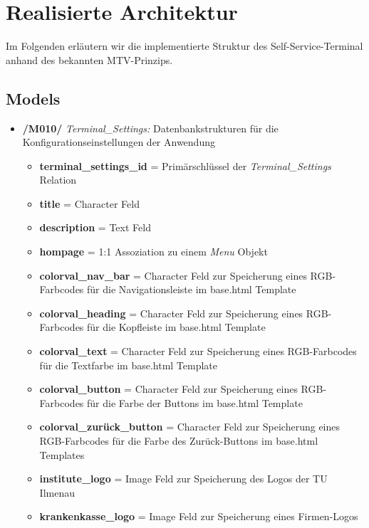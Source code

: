 \section{Realisierte Architektur}

Im Folgenden erläutern wir die implementierte Struktur des Self-Service-Terminal anhand des bekannten MTV-Prinzips.

\subsection{Models}
\begin{itemize}
    \item \textbf{/M010/} \textit{Terminal\_Settings:} Datenbankstrukturen für die Konfigurationseinstellungen der Anwendung
    \begin{itemize}
        \item \textbf{terminal\_settings\_id} = Primärschlüssel der \textit{Terminal\_Settings} Relation
        \item \textbf{title} = Character Feld
        \item \textbf{description} = Text Feld
        \item \textbf{hompage} = 1:1 Assoziation zu einem \textit{Menu} Objekt
        \item \textbf{colorval\_nav\_bar} = Character Feld zur Speicherung eines RGB-Farbcodes für die Navigationsleiste im base.html Template
        \item \textbf{colorval\_heading} = Character Feld zur Speicherung eines RGB-Farbcodes für die Kopfleiste im base.html Template
        \item \textbf{colorval\_text} = Character Feld zur Speicherung eines RGB-Farbcodes für die Textfarbe im base.html Template
        \item \textbf{colorval\_button} = Character Feld zur Speicherung eines RGB-Farbcodes für die Farbe der Buttons im base.html Template
        \item \textbf{colorval\_zurück\_button} = Character Feld zur Speicherung eines RGB-Farbcodes für die Farbe des Zurück-Buttons im base.html Templates
        \item \textbf{institute\_logo} = Image Feld zur Speicherung des Logos der TU Ilmenau
        \item \textbf{krankenkasse\_logo} = Image Feld zur Speicherung eines Firmen-Logos
    \end{itemize}
\end{itemize}
\newpage

